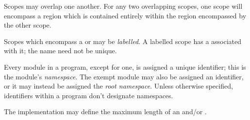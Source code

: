 \specsubitem
Scopes may overlap one another. For any two overlapping scopes, one scope will
encompass a region which is contained entirely within the region encompassed by
the other scope.

\specsubitem
Scopes which encompass a  or
 may be \textit{labelled}. A labelled scope has
a  associated with it; the name need not be unique.

\specsubitem
Every module in a program, except for one, is assigned a unique identifier; this
is the module's \textit{namespace}. The exempt module may also be assigned an
identifier, or it may instead be assigned the \textit{root namespace}. Unless
otherwise specified, identifiers within a program don't designate namespaces.

\specsubitem
The implementation may define the maximum length of an 
and/or .
